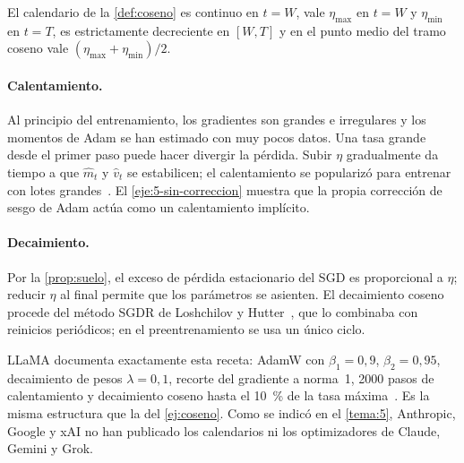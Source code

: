 \begin{proposicion}[Propiedades]\label{prop:coseno}
El calendario de la \cref{def:coseno} es continuo en $t=W$, vale $\eta_{\max}$ en $t=W$ y $\eta_{\min}$ en $t=T$, es estrictamente decreciente en $[W,T]$ y en el punto medio del tramo coseno vale $(\eta_{\max}+\eta_{\min})/2$.
\end{proposicion}

\addtocounter{figure}{1}%

\addtocounter{definicion}{1}%

\paragraph{Calentamiento.} Al principio del entrenamiento, los gradientes son grandes e irregulares y los momentos de Adam se han estimado con muy pocos datos. Una tasa grande desde el primer paso puede hacer divergir la pérdida. Subir $\eta$ gradualmente da tiempo a que $\hat m_t$ y $\hat v_t$ se estabilicen; el calentamiento se popularizó para entrenar con lotes grandes~\cite{goyal}. El \cref{eje:5-sin-correccion} muestra que la propia corrección de sesgo de Adam actúa como un calentamiento implícito.

\paragraph{Decaimiento.} Por la \cref{prop:suelo}, el exceso de pérdida estacionario del SGD es proporcional a $\eta$; reducir $\eta$ al final permite que los parámetros se asienten. El decaimiento coseno procede del método SGDR de Loshchilov y Hutter~\cite{sgdr}, que lo combinaba con reinicios periódicos; en el preentrenamiento se usa un único ciclo.

\begin{observacion}
LLaMA documenta exactamente esta receta: AdamW con $\beta_1=0{,}9$, $\beta_2=0{,}95$, decaimiento de pesos $\lambda=0{,}1$, recorte del gradiente a norma~1, 2000 pasos de calentamiento y decaimiento coseno hasta el 10~\% de la tasa máxima~\cite[§2.3]{llama}. Es la misma estructura que la del \cref{ej:coseno}. Como se indicó en el \cref{tema:5}, Anthropic, Google y xAI no han publicado los calendarios ni los optimizadores de Claude, Gemini y Grok.
\end{observacion}

